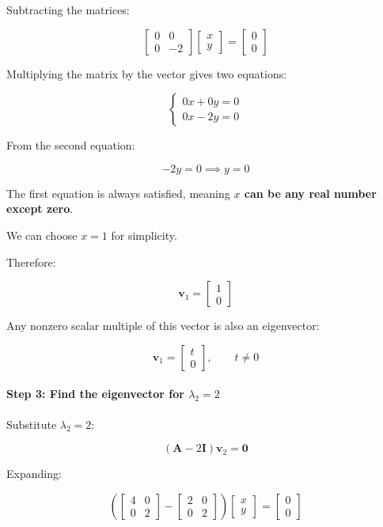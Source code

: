 \documentclass[11pt]{article}
\begin{document}
Subtracting the matrices:

\[
\begin{bmatrix}
0 & 0 \\
0 & -2
\end{bmatrix}
\begin{bmatrix}
x \\
y
\end{bmatrix}
=
\begin{bmatrix}
0 \\
0
\end{bmatrix}
\]

Multiplying the matrix by the vector gives two equations:

\[
\begin{cases}
0x + 0y = 0 \\
0x - 2y = 0
\end{cases}
\]

From the second equation:

\[
-2y = 0 \implies y = 0
\]

The first equation is always satisfied, meaning \textbf{\(x\) can be any
real number except zero}.

We can choose \(x = 1\) for simplicity.

Therefore:

\[
\boxed{
\mathbf{v}_1 =
\begin{bmatrix}
1 \\
0
\end{bmatrix}
}
\]

Any nonzero scalar multiple of this vector is also an eigenvector:

\[
\mathbf{v}_1 =
\begin{bmatrix}
t \\
0
\end{bmatrix},
\qquad t \neq 0
\]

\paragraph{\texorpdfstring{Step 3: Find the eigenvector for
\(\lambda_2 = 2\)}{Step 3: Find the eigenvector for \textbackslash lambda\_2 = 2}}\label{step-3-find-the-eigenvector-for-lambda_2-2}

Substitute \(\lambda_2 = 2\):

\[
(\mathbf{A} - 2\mathbf{I})\mathbf{v}_2 = \mathbf{0}
\]

Expanding:

\[
\left(
\begin{bmatrix}
4 & 0 \\
0 & 2
\end{bmatrix}
-
\begin{bmatrix}
2 & 0 \\
0 & 2
\end{bmatrix}
\right)
\begin{bmatrix}
x \\
y
\end{bmatrix}
=
\begin{bmatrix}
0 \\
0
\end{bmatrix}
\]
\end{document}
